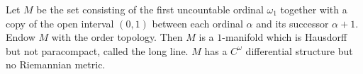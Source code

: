 Let $M$ be the set consisting of the first uncountable ordinal $\omega_1$ together with a copy of the open interval $(0,1)$ between each ordinal $\alpha$ and its successor $\alpha+1$. Endow $M$ with the order topology. Then $M$ is a $1$-manifold which is Hausdorff but not paracompact, called the long line. $M$ has a $C^\omega$ differential structure but no Riemannian metric.
